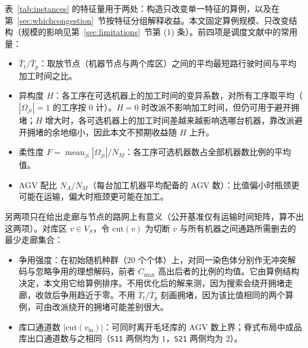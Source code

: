 \documentclass[manuscript,screen,review]{acmart}
\begin{document}
表~\ref{tab:instances} 的特征量用于两处：构造只改变单一特征的算例，以及在第~\ref{sec:whichcongestion}~节按特征分组解释收益。本文固定算例规模、只改变结构（规模的影响见第~\ref{sec:limitations}~节第 (1) 条）。前四项是调度文献中的常用量：
\begin{itemize}[leftmargin=*,topsep=2pt,itemsep=1pt]
  \item $\bar{T}_t/\bar{T}_p$：取放节点（机器节点与两个库区）之间的平均最短路行驶时间与平均加工时间之比。
  \item 异构度 $H$：各工序在可选机器上的加工时间的变异系数，对所有工序取平均（$|\Omega_{ji}|=1$ 的工序按 $0$ 计）。$H=0$ 时改派不影响加工时间，但仍可用于避开拥堵；$H$ 增大时，各可选机器上的加工时间差越来越影响选哪台机器，靠改派避开拥堵的余地缩小，因此本文不预期收益随 $H$ 上升。
  \item 柔性度 $F=\operatorname{mean}_{ji}|\Omega_{ji}|/N_M$：各工序可选机器数占全部机器数比例的平均值。
  \item AGV 配比 $N_A/N_M$（每台加工机器平均配备的 AGV 数）：比值偏小时瓶颈更可能在运输，偏大时瓶颈更可能在加工。
\end{itemize}
另两项只在给出走廊与节点的路网上有意义（公开基准仅有运输时间矩阵，算不出这两项）。对库区 $v\in V_S$，令 $\mathrm{cut}(v)$ 为切断 $v$ 与所有机器之间通路所需删去的最少走廊集合：
\begin{itemize}[leftmargin=*,topsep=2pt,itemsep=1pt]
  \item 争用强度：在初始随机种群（$20$ 个个体）上，对同一染色体分别作无冲突解码与忽略争用的理想解码，前者 $C_{\max}$ 高出后者的比例的均值。它由算例结构决定，本文用它给算例排序。不用优化后的解来测，因为搜索会绕开拥堵走廊，收敛后争用趋近于零。不用 $\bar{T}_t/\bar{T}_p$ 刻画拥堵，因为该比值相同的两个算例，可由改派绕开的拥堵可能差别很大。
  \item 库口通道数 $|\mathrm{cut}(v_{\mathrm{in}})|$：可同时离开毛坯库的 AGV 数上界；脊式布局中成品库出口通道数与之相同（\texttt{S11} 两侧均为 $1$，\texttt{S21} 两侧均为 $2$）。
\end{itemize}
\end{document}
